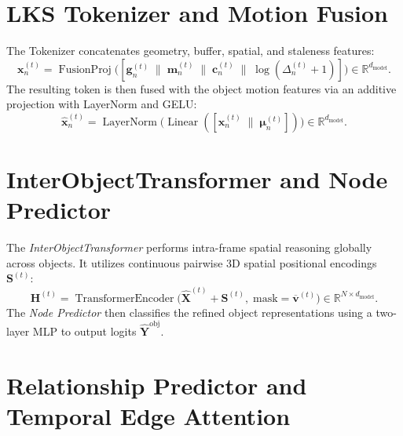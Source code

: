\documentclass{article}
\newcommand{\mR}{\mathbb{R}}
\newcommand{\op}[1]{\operatorname{#1}}
\newcommand{\mat}[1]{\bm{#1}}
\begin{document}
\section{LKS Tokenizer and Motion Fusion}
\label{sec:tokenizer_fusion}

The Tokenizer concatenates geometry, buffer, spatial, and staleness features:
\begin{equation}
    \mat{x}_n^{(t)} = \op{FusionProj}\bigl([\mat{g}_n^{(t)} \;\|\; \mat{m}_n^{(t)} \;\|\; \mat{c}_n^{(t)} \;\|\; \log(\Delta_n^{(t)} + 1)]\bigr) \in \mR^{d_{\text{model}}}.
    \label{eq:tokenizer}
\end{equation}
The resulting token is then fused with the object motion features via an additive projection with LayerNorm and GELU:
\begin{equation}
    \hat{\mat{x}}_n^{(t)} = \op{LayerNorm}\bigl(\op{Linear}([\mat{x}_n^{(t)} \;\|\; \mat{\mu}_n^{(t)}])\bigr) \in \mR^{d_{\text{model}}}.
    \label{eq:fusion}
\end{equation}

\section{InterObjectTransformer and Node Predictor}
\label{sec:iot_np}

The \emph{InterObjectTransformer} performs intra-frame spatial reasoning globally across objects. It utilizes continuous pairwise 3D spatial positional encodings $\mat{S}^{(t)}$:
\begin{equation}
    \mat{H}^{(t)} = \op{TransformerEncoder}\bigl(\hat{\mat{X}}^{(t)} + \mat{S}^{(t)},\; \text{mask}=\overline{\mat{v}}^{(t)}\bigr) \in \mR^{N \times d_{\text{model}}}.
    \label{eq:iot}
\end{equation}
The \emph{Node Predictor} then classifies the refined object representations using a two-layer MLP to output logits $\hat{\mat{Y}}^{\text{obj}}$.

\section{Relationship Predictor and Temporal Edge Attention}
\label{sec:tea}
\end{document}
